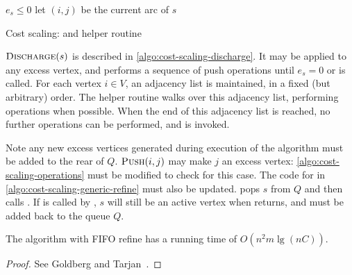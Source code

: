 \begin{algorithm}
\begin{algorithmic}[1]
        \Repeat
            \State {}
        \Until $e_s \leq 0$
    \EndFunction
    \setcounter{ALG@line}{0}
    \Statex
        \State let $(i,j)$ be the current arc of $s$
         
        \Else
                \State {}
            \Else
            \EndIf
        \EndIf
    \EndFunction
\end{algorithmic}
\caption{Cost scaling:  and helper routine }
\label{algo:cost-scaling-discharge}
\end{algorithm}

$\textproc{Discharge}(s)$ is described in \cref{algo:cost-scaling-discharge}. It may be applied to any excess vertex, and performs a sequence of push operations until $e_s = 0$ or  is called. For each vertex $i \in V$, an adjacency list is maintained, in a fixed (but arbitrary) order. The helper routine  walks over this adjacency list, performing  operations when possible. When the end of this adjacency list is reached, no further  operations can be performed, and  is invoked.

Note any new excess vertices generated during execution of the algorithm must be added to the rear of $Q$. $\textproc{Push}(i,j)$ may make $j$ an excess vertex: \cref{algo:cost-scaling-operations} must be modified to check for this case. The code for  in \cref{algo:cost-scaling-generic-refine} must also be updated.  pops $s$ from $Q$ and then calls . If  is called by , $s$ will still be an active vertex when  returns, and must be added back to the queue $Q$.\\

\begin{thm} \label{thm:cost-scaling-first-active-complexity}
The algorithm with FIFO refine has a running time of $O(n^2m \lg (nC))$.
\end{thm}
\begin{proof}
See Goldberg and Tarjan~\cite[theorem~6.2]{Goldberg:1990}.
\end{proof}

